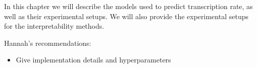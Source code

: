 In this chapter we will describe the models used to predict transcription rate, as well as their experimental setups. We will also provide the experimental setups for the interpretability methods.

Hannah's recommendations:
\begin{itemize}
  \item Give implementation details and hyperparameters
\end{itemize}
